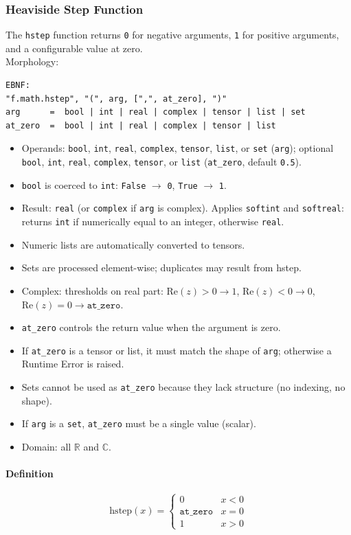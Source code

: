 \subsubsection{Heaviside Step Function}
The \texttt{hstep} function returns \texttt{0} for negative arguments, \texttt{1} for positive arguments, and a configurable value at zero.\\
Morphology:
\begin{verbatim}
EBNF:
"f.math.hstep", "(", arg, [",", at_zero], ")"
arg      =  bool | int | real | complex | tensor | list | set
at_zero  =  bool | int | real | complex | tensor | list
\end{verbatim}
\begin{itemize}
\item Operands: \texttt{bool}, \texttt{int}, \texttt{real}, \texttt{complex}, \texttt{tensor}, \texttt{list}, or \texttt{set} (\texttt{arg}); optional \texttt{bool}, \texttt{int}, \texttt{real}, \texttt{complex}, \texttt{tensor}, or \texttt{list} (\texttt{at\_zero}, default \texttt{0.5}).
\item \texttt{bool} is coerced to \texttt{int}: \texttt{False} $\to$ \texttt{0}, \texttt{True} $\to$ \texttt{1}.
\item Result: \texttt{real} (or \texttt{complex} if \texttt{arg} is complex). Applies \texttt{softint} and \texttt{softreal}: returns \texttt{int} if numerically equal to an integer, otherwise \texttt{real}.
\item Numeric lists are automatically converted to tensors.
\item Sets are processed element-wise; duplicates may result from hstep.
\item Complex: thresholds on real part: $\text{Re}(z) > 0 \to 1$, $\text{Re}(z) < 0 \to 0$, $\text{Re}(z) = 0 \to \texttt{at\_zero}$.
\item \texttt{at\_zero} controls the return value when the argument is zero.
\item If \texttt{at\_zero} is a tensor or list, it must match the shape of \texttt{arg}; otherwise a Runtime Error is raised.
\item Sets cannot be used as \texttt{at\_zero} because they lack structure (no indexing, no shape).
\item If \texttt{arg} is a \texttt{set}, \texttt{at\_zero} must be a single value (scalar).
\item Domain: all $\mathbb{R}$ and $\mathbb{C}$.
\end{itemize}

\paragraph{Definition}
\[
\text{hstep}(x) = \begin{cases} 0 & x < 0 \\ \texttt{at\_zero} & x = 0 \\ 1 & x > 0 \end{cases}
\]


